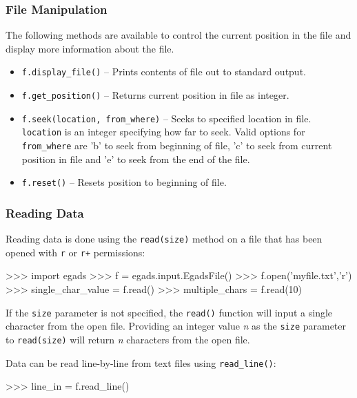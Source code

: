 \documentclass[a4paper,11pt]{report}
\begin{document}
\subsubsection{File Manipulation}

The following methods are available to control the current position in the file and display more 
information about the file.
\begin{itemize}
 \item \verb|f.display_file()| -- Prints contents of file out to standard output.

 \item \verb|f.get_position()| -- Returns current position in file as integer.

 \item \verb|f.seek(location, from_where)| -- Seeks to specified location in file. \verb|location| is
an integer specifying how far to seek. Valid options for \verb|from_where| are 'b' to seek from beginning
of file, 'c' to seek from current position in file and 'e' to seek from the end of the file.

 \item \verb|f.reset()| -- Resets position to beginning of file.

\end{itemize}


\subsubsection{Reading Data}

Reading data is done using the \verb|read(size)| method on a file that has been opened with \verb|r| or
\verb|r+| permissions:

\begin{command}
    >>> import egads
    >>> f = egads.input.EgadsFile()
    >>> f.open('myfile.txt','r')
    >>> single_char_value = f.read()
    >>> multiple_chars = f.read(10)
\end{command}

If the \verb|size| parameter is not specified, the \verb|read()| function will input a single character
from the open file. Providing an integer value \textit{n} as the \verb|size| parameter to \verb|read(size)| 
will return \textit{n} characters from the open file.

Data can be read line-by-line from text files using \verb|read_line()|:

\begin{command}
   >>> line_in = f.read_line()
\end{command}
\end{document}
